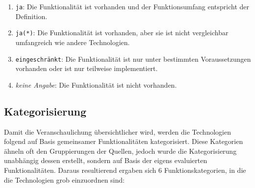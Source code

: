\begin{enumerate}
	\item \texttt{ja}: Die Funktionalität ist vorhanden und der Funktionsumfang entspricht der Definition.
	\item \texttt{ja(*)}: Die Funktionalität ist vorhanden, aber sie ist nicht vergleichbar umfangreich wie andere Technologien.
	\item \texttt{eingeschränkt}: Die Funktionalität ist nur unter bestimmten Voraussetzungen vorhanden oder ist nur teilweise implementiert.
	\item \textit{keine Angabe}: Die Funktionalität ist nicht vorhanden.
\end{enumerate}



\subsection{Kategorisierung}

Damit die Veranschaulichung übersichtlicher wird, werden die Technologien folgend auf Basis gemeinsamer Funktionalitäten kategorisiert. Diese Kategorien ähneln oft den Gruppierungen der Quellen, jedoch wurde die Kategorisierung unabhängig dessen erstellt, sondern auf Basis der eigens evaluierten Funktionalitäten. Daraus resultierend ergaben sich 6 Funktionskategorien, in die die Technologien grob einzuordnen sind:

